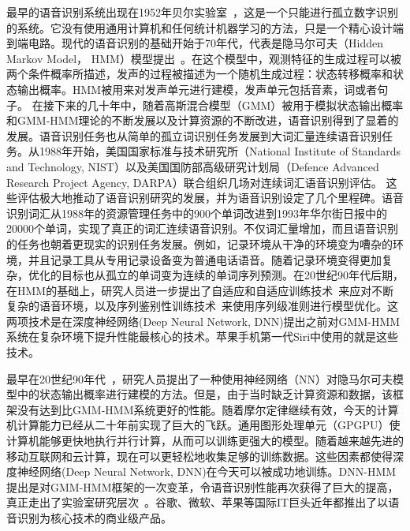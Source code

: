 最早的语音识别系统出现在1952年贝尔实验室~\cite{davis1952automatic}，这是一个只能进行孤立数字识别的系统。它没有使用通用计算机和任何统计机器学习的方法，只是一个精心设计端到端电路。现代的语音识别的基础开始于70年代，代表是隐马尔可夫（Hidden Markov Model， HMM）模型提出~\cite{baker1975dragon, jelinek1976continuous}。在这个模型中，观测特征的生成过程可以被两个条件概率所描述，发声的过程被描述为一个随机生成过程：状态转移概率和状态输出概率。HMM被用来对发声单元进行建模，发声单元包括音素，词或者句子。
在接下来的几十年中，随着高斯混合模型（GMM）被用于模拟状态输出概率和GMM-HMM理论的不断发展以及计算资源的不断改进，语音识别得到了显着的发展。语音识别任务也从简单的孤立词识别任务发展到大词汇量连续语音识别任务。从1988年开始，美国国家标准与技术研究所（National Institute of Standards and Technology, NIST）以及美国国防部高级研究计划局（Defence Advanced Research Project Agency, DARPA）联合组织几场对连续词汇语音识别评估。
这些评估极大地推动了语音识别研究的发展，并为语音识别设定了几个里程碑。语音识别词汇从1988年的资源管理任务中的900个单词改进到1993年华尔街日报中的20000个单词，实现了真正的词汇连续语音识别。不仅词汇量增加，而且语音识别的任务也朝着更现实的识别任务发展。例如，记录环境从干净的环境变为嘈杂的环境，并且记录工具从专用记录设备变为普通电话语音。随着记录环境变得更加复杂，优化的目标也从孤立的单词变为连续的单词序列预测。在20世纪90年代后期，在HMM的基础上，研究人员进一步提出了自适应和自适应训练技术~\cite{anastasakos1996compact,digalakis1995speaker,furui1989unsupervised,gales1998cluster,gales1998maximum,gales2001adaptive,gales2001multiple,gauvain1994maximum,kuhn1998eigenvoices,lee1996speaker,leggetter1995maximum,neumeyer1995comparative,pye1997experiments}来应对不断复杂的语音环境，以及序列鉴别性训练技术~\cite{bahl1986maximum,schluter2001comparison,chou1993minimum,goel2000minimum,juang1997minimum,povey2005discriminative,povey2001improved}来使用序列级准则进行模型优化。这两项技术是在深度神经网络(Deep Neural Network, DNN)提出之前对GMM-HMM系统在复杂环境下提升性能最核心的技术。苹果手机第一代Siri中使用的就是这些技术。

最早在20世纪90年代~\cite{bourlard1989continuous,bourlard1992cdnn,bourlard2012connectionist}，研究人员提出了一种使用神经网络（NN）对隐马尔可夫模型中的状态输出概率进行建模的方法。但是，由于当时缺乏计算资源和数据，该框架没有达到比GMM-HMM系统更好的性能。随着摩尔定律继续有效，今天的计算机计算能力已经从二十年前实现了巨大的飞跃。通用图形处理单元（GPGPU）使计算机能够更快地执行并行计算，从而可以训练更强大的模型。随着越来越先进的移动互联网和云计算，现在可以更轻松地收集足够的训练数据。这些因素都使得深度神经网络(Deep Neural Network, DNN)在今天可以被成功地训练。DNN-HMM提出是对GMM-HMM框架的一次变革，令语音识别性能再次获得了巨大的提高，真正走出了实验室研究层次~\cite{ASRBook-Yu2014,CD-DNN-HMM-dahl2012,DNN4ASR-hinton2012,qian2016very,TDNN-peddinti2015,Deepspeech2-amodei2015,LACE-yu2016,xiong2017microsoft}。谷歌、微软、苹果等国际IT巨头近年都推出了以语音识别为核心技术的商业级产品。



